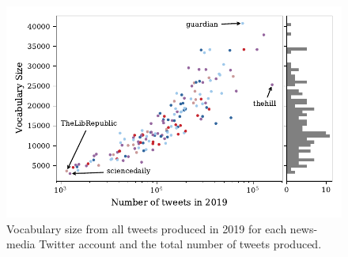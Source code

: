 \begin{figure}[h!]
\centering
\includegraphics{chapter1/figs/vocab_vs_activity.pdf}
\caption{Vocabulary size from all tweets produced in 2019 for each news-media Twitter account and the total number of tweets produced.}\label{fig:data_vocabvsactivity}
\end{figure}



%
